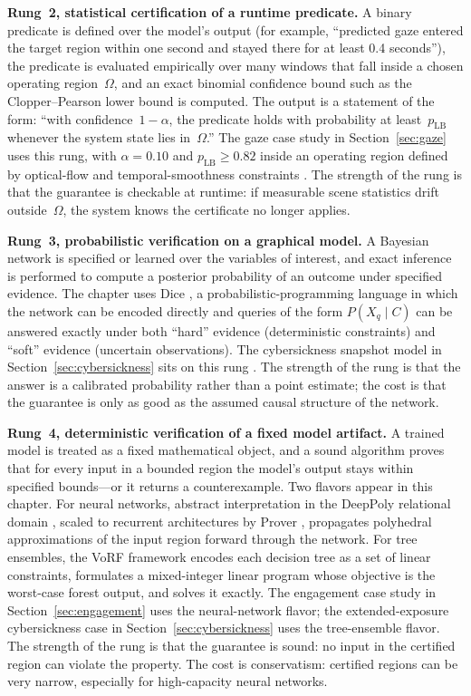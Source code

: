 \documentclass[graybox]{svmult}
\begin{document}
\textbf{Rung~2, statistical certification of a runtime predicate.} A binary predicate is defined over the model's output (for example, ``predicted gaze entered the target region within one second and stayed there for at least 0.4 seconds''), the predicate is evaluated empirically over many windows that fall inside a chosen operating region~$\Omega$, and an exact binomial confidence bound such as the Clopper--Pearson lower bound \citep{clopper1934} is computed. The output is a statement of the form: ``with confidence~$1-\alpha$, the predicate holds with probability at least~$p_{\text{LB}}$ whenever the system state lies in~$\Omega$.'' The gaze case study in Section~\ref{sec:gaze} uses this rung, with $\alpha=0.10$ and $p_{\text{LB}}\geq0.82$ inside an operating region defined by optical-flow and temporal-smoothness constraints \citep{gaze2025reliability}. The strength of the rung is that the guarantee is checkable at runtime: if measurable scene statistics drift outside~$\Omega$, the system knows the certificate no longer applies.

\textbf{Rung~3, probabilistic verification on a graphical model.} A Bayesian network is specified or learned over the variables of interest, and exact inference is performed to compute a posterior probability of an outcome under specified evidence. The chapter uses Dice \citep{holtzen2020dice}, a probabilistic-programming language in which the network can be encoded directly and queries of the form $P(X_q \mid C)$ can be answered exactly under both ``hard'' evidence (deterministic constraints) and ``soft'' evidence (uncertain observations). The cybersickness snapshot model in Section~\ref{sec:cybersickness} sits on this rung \citep{wu2025cybersickness_bn}. The strength of the rung is that the answer is a calibrated probability rather than a point estimate; the cost is that the guarantee is only as good as the assumed causal structure of the network.

\textbf{Rung~4, deterministic verification of a fixed model artifact.} A trained model is treated as a fixed mathematical object, and a sound algorithm proves that for every input in a bounded region the model's output stays within specified bounds---or it returns a counterexample. Two flavors appear in this chapter. For neural networks, abstract interpretation in the DeepPoly relational domain \citep{singh2019deeppoly}, scaled to recurrent architectures by Prover \citep{ryou2021prover}, propagates polyhedral approximations of the input region forward through the network. For tree ensembles, the VoRF framework \citep{tornblom2019vorf} encodes each decision tree as a set of linear constraints, formulates a mixed-integer linear program whose objective is the worst-case forest output, and solves it exactly. The engagement case study in Section~\ref{sec:engagement} uses the neural-network flavor; the extended-exposure cybersickness case in Section~\ref{sec:cybersickness} uses the tree-ensemble flavor. The strength of the rung is that the guarantee is sound: no input in the certified region can violate the property. The cost is conservatism: certified regions can be very narrow, especially for high-capacity neural networks.
\end{document}
